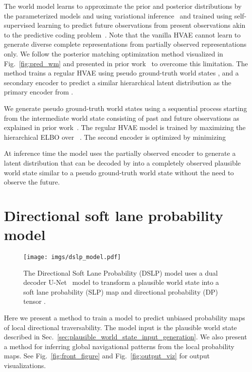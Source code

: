 \documentclass[letterpaper, 10 pt, conference]{ieeeconf}
\begin{document}
The world model learns to approximate the prior and posterior distributions by the parameterized models  and  using variational inference~\cite{kingma2013vae} and trained using self-supervised learning to predict future observations from present observations akin to the predictive coding problem~\cite{marino2019pred_coding_vae_bio}. Note that the vanilla HVAE cannot learn to generate diverse complete representations from partially observed representations only. We follow the posterior matching optimization method visualized in Fig.~\ref{fig:pred_wm} and presented in prior work~\cite{karlsson2023pred_wm} to overcome this limitation. The method trains a regular HVAE using pseudo ground-truth world states , and a secondary encoder  to predict a similar hierarchical latent distribution  as the primary encoder  from .

We generate pseudo ground-truth world states  using a sequential process starting from the intermediate world state  consisting of past and future observations as explained in prior work~\cite{karlsson2023pred_wm}.
The regular HVAE model is trained by maximizing the hierarchical ELBO over ~\cite{child2021vdvae, karlsson2023pred_wm}.
The second encoder is optimized by minimizing



At inference time the model uses the partially observed encoder to generate a latent distribution  that can be decoded by  into a completely observed plausible world state  similar to a pseudo ground-truth world state  without the need to observe the future.





\section{Directional soft lane probability model}
\label{sec:dslp_model}

\begin{figure}\centering
\texttt{[image: imgs/dslp\_model.pdf]}
\vspace{-3mm}
\caption{The Directional Soft Lane Probability (DSLP) model uses a dual decoder U-Net~\cite{ronneberger2015unet} model to transform a plausible world state  into a soft lane probability (SLP) map  and directional probability (DP) tensor .}
\label{fig:dslp_model}
\vspace{-5mm}
\end{figure}

Here we present a method to train a model to predict unbiased probability maps of local directional traversability. The model input is the plausible world state  described in Sec.~\ref{sec:plausible_world_state_input_generation}. We also present a method for inferring global navigational patterns from the local probability maps. See Fig.~\ref{fig:front_figure} and Fig.~\ref{fig:output_viz} for output visualizations.
\end{document}
